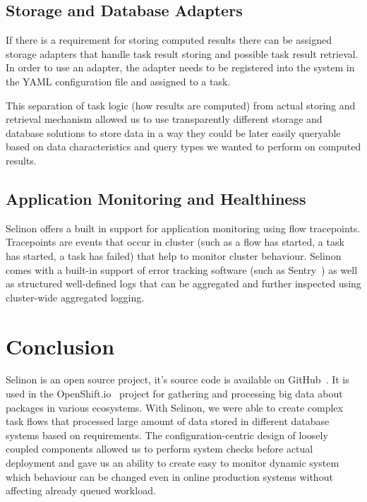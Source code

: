 \documentclass[a4paper]{llncs}
\begin{document}
\subsection{Storage and Database Adapters} \label{subsection_storage}

If there is a requirement for storing computed results there can be assigned storage adapters that handle task result storing and possible task result retrieval. In order to use an adapter, the adapter needs to be registered into the system in the YAML configuration file and assigned to a task.

This separation of task logic (how results are computed) from actual storing and retrieval mechanism allowed us to use transparently different storage and database solutions to store data in a way they could be later easily queryable based on data characteristics and query types we wanted to perform on computed results.

\subsection{Application Monitoring and Healthiness}

Selinon offers a built in support for application monitoring using flow tracepoints. Tracepoints are events that occur in cluster (such as a flow has started, a task has started, a task has failed) that help to monitor cluster behaviour. Selinon comes with a built-in support of error tracking software (such as Sentry~\cite{ref_sentry}) as well as structured well-defined logs that can be aggregated and further inspected using cluster-wide aggregated logging.

\section{Conclusion}


Selinon is an open source project, it's source code is available on GitHub~\cite{ref_selinon_github}. It is used in the OpenShift.io~\cite{ref_openshift_io} project for gathering and processing big data about packages in various ecosystems. With Selinon, we were able to create complex task flows that processed large amount of data stored in different database systems based on requirements. The configuration-centric design of loosely coupled components allowed us to perform system checks before actual deployment and gave us an ability to create easy to monitor dynamic system which behaviour can be changed even in online production systems without affecting already queued workload.
\end{document}
